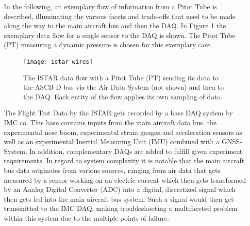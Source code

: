 In the following, an exemplary flow of information from a Pitot Tube is described, illuminating the various facets and trade-offs that need to be made along the way to the main aircraft bus and then the DAQ. In Figure \ref{fig:istar_wires} the exemplary data flow for a single sensor to the DAQ is shown. The Pitot Tube (PT) measuring a dynamic pressure is chosen for this exemplary case.
\begin{figure}[h]
    \centering
    \texttt{[image: istar\_wires]}
    \caption[The ISTAR crosssection displaying sensor information flow]{The ISTAR data flow with a Pitot Tube (PT) sending its data to the ASCB-D bus via the Air Data System (not shown) and then to the DAQ. Each entity of the flow applies its own sampling of data.}
    \label{fig:istar_wires}
\end{figure}


The Flight Test Data by the ISTAR gets recorded by a base DAQ system by IMC co. This base contains inputs from the main aircraft data bus, the experimental nose boom, experimental strain gauges and acceleration sensors as well as an experimental Inertial Measuring Unit (IMU) combined with a GNSS-System. In addition, complementary DAQs are added to fulfill given experiment requirements. In regard to system complexity it is notable that the main aircraft bus data originates from various sources, ranging from air data that gets measured by a sensor working on an electric current which then gets transformed by an Analog Digital Converter (ADC) into a digital, discretized signal which then gets fed into the main aircraft bus system. Such a signal would then get transmitted to the IMC DAQ, making troubleshooting a multifaceted problem within this system due to the multiple points of failure.

